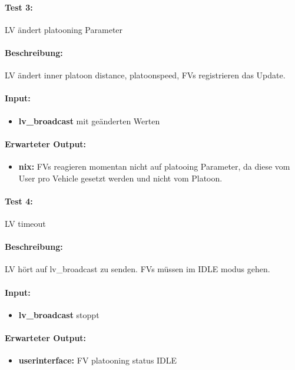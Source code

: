 \documentclass[a4paper, 12pt, titlepage]{scrartcl}
\begin{document}
{			\paragraph{Test 3:}{LV ändert platooning Parameter}
			\paragraph{Beschreibung:} LV ändert inner platoon distance, platoonspeed, FVs registrieren das Update.
			\paragraph{Input:}
			\begin{itemize} \itemsep-0.5em
				\item \textbf{lv\_broadcast} mit geänderten Werten
			\end{itemize}

			\paragraph{Erwarteter Output:}
			\begin{itemize} \itemsep-0.5em
				\item \textbf{nix:} FVs reagieren momentan nicht auf platooing Parameter, da diese vom User pro Vehicle gesetzt werden und nicht vom Platoon.
			\end{itemize}

			\paragraph{Test 4:}{LV timeout}
			\paragraph{Beschreibung:} LV hört auf lv\_broadcast zu senden. FVs müssen im IDLE modus gehen.
			\paragraph{Input:}
			\begin{itemize} \itemsep-0.5em
				\item \textbf{lv\_broadcast} stoppt
			\end{itemize}

			\paragraph{Erwarteter Output:}
			\begin{itemize} \itemsep-0.5em
				\item \textbf{userinterface:} FV platooning status IDLE
			\end{itemize}

}
\end{document}
